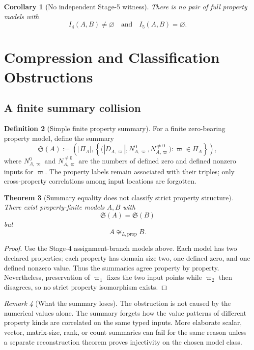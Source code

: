\documentclass[11pt]{article}
\newtheorem{theorem}{Theorem}[section]
\newtheorem{corollary}[theorem]{Corollary}
\theoremstyle{definition}
\newtheorem{definition}[theorem]{Definition}
\theoremstyle{remark}
\newtheorem{remark}[theorem]{Remark}
\begin{document}
\begin{corollary}[No independent Stage-5 witness]
There is no pair of full property models with
\[
I_4(A,B)\neq\varnothing
\quad\text{and}\quad
I_5(A,B)=\varnothing.
\]
\end{corollary}

\section{Compression and Classification Obstructions}
\label{sec:compression}

\subsection{A finite summary collision}

\begin{definition}[Simple finite property summary]
For a finite zero-bearing property model, define the summary
\[
\mathfrak S(A):=
\left(
|\Pi_A|,
\left\{
\bigl(|D_{A,\varpi}|,N^0_{A,\varpi},N^{\neq0}_{A,\varpi}\bigr)
:\varpi\in\Pi_A
\right\}
\right),
\]
where \(N^0_{A,\varpi}\) and \(N^{\neq0}_{A,\varpi}\) are the numbers of defined zero and defined nonzero inputs for \(\varpi\).
The property labels remain associated with their triples; only cross-property correlations among input locations are forgotten.
\end{definition}

\begin{theorem}[Summary equality does not classify strict property structure]
\label{thm:compression}
There exist property-finite models \(A,B\) with
\[
\mathfrak S(A)=\mathfrak S(B)
\]
but
\[
A\not\cong_{L,\mathrm{prop}}B.
\]
\end{theorem}

\begin{proof}
Use the Stage-4 assignment-branch models above.
Each model has two declared properties; each property has domain size two, one defined zero, and one defined nonzero value.
Thus the summaries agree property by property.
Nevertheless, preservation of \(\varpi_1\) fixes the two input points while \(\varpi_2\) then disagrees, so no strict property isomorphism exists.
\end{proof}

\begin{remark}[What the summary loses]
The obstruction is not caused by the numerical values alone.
The summary forgets how the value patterns of different property kinds are correlated on the same typed inputs.
More elaborate scalar, vector, matrix-size, rank, or count summaries can fail for the same reason unless a separate reconstruction theorem proves injectivity on the chosen model class.
\end{remark}
\end{document}
